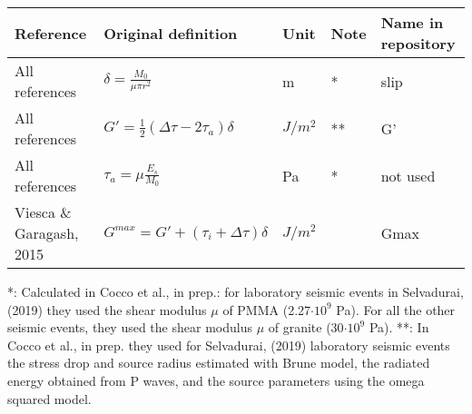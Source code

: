 \documentclass{article}
\begin{document}
\begin{longtable}{|p{4 cm}|p{8 cm}|p{1.25 cm}|p{1.25 cm}|p{1.5 cm}|}
\hline
\textbf{Reference} & \textbf{Original definition} & \textbf{Unit} & \textbf{Note} & \textbf{Name in repository} \\ \hline
All references & \( \displaystyle \delta= \frac{M_0}{\mu \pi r^2} \) & m & * & slip \\
All references & \( \displaystyle G'= \frac{1}{2}(\Delta \tau - 2\tau_a)\delta \) & $J/m^2$ & **  & G' \\
All references & \( \displaystyle \tau_a = \mu \frac{E_s}{M_0} \) & Pa & * & not used \\
Viesca \& Garagash, 2015 & \( \displaystyle G^{max}=G'+(\tau_i + \Delta \tau)\delta \) & $J/m^2$ & & Gmax \\

\hline
\end{longtable}
*: Calculated in Cocco et al., in prep.: for laboratory seismic events in Selvadurai, (2019) they used the shear modulus $\mu$ of PMMA (2.27$\cdot10^9$ Pa). For all the other seismic events, they used the shear modulus $\mu$ of granite (30$\cdot10^9$ Pa).
**: In Cocco et al., in prep. they used for Selvadurai, (2019) laboratory seismic events the stress drop and source radius estimated with Brune model, the radiated energy obtained from P waves, and the source parameters using the omega squared model.				



\end{document}
